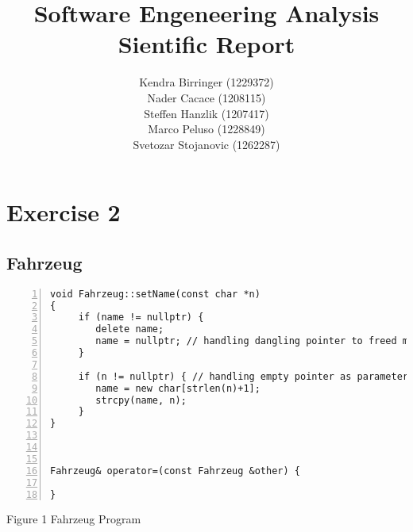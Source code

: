 \documentclass{llncs}
\begin{document}
\makeatletter
\renewcommand\subsubsection{\@startsection{subsubsection}{2}{\z@}%
                       {-18\p@ \@plus -4\p@ \@minus -4\p@}%
                       {\lineskip}%
                       {\normalfont\normalsize\bfseries\boldmath}}
\makeatother


\title{Software Engeneering Analysis Sientific Report}

\author{Kendra Birringer (1229372) \\ Nader Cacace (1208115) \\ Steffen Hanzlik (1207417) \\ Marco Peluso (1228849) \\ Svetozar Stojanovic (1262287)}


\maketitle              %
\section{Exercise 2}
\subsection{Fahrzeug }

\begin{lstlisting}[basicstyle=\footnotesize\ttfamily, numbers=left, stepnumber=1, numberstyle = \normalsize]
void Fahrzeug::setName(const char *n)
{
     if (name != nullptr) {
     	delete name;
     	name = nullptr; // handling dangling pointer to freed memory
     }

     if (n != nullptr) { // handling empty pointer as parameter, preventing strlen from crashing
     	name = new char[strlen(n)+1];
     	strcpy(name, n);
     }
}



Fahrzeug& operator=(const Fahrzeug &other) {
	
}

\end{lstlisting}
\footnotesize{Figure 1 Fahrzeug Program}\newline
\end{document}
